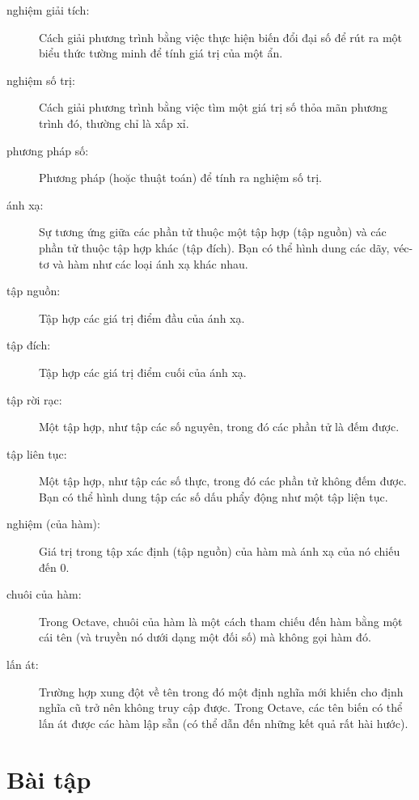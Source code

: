 \documentclass[12pt]{book}
\begin{document}
\begin{description}

\item[nghiệm giải tích:] Cách giải phương trình bằng việc thực hiện
biến đổi đại số để rút ra một biểu thức tường minh để tính giá trị
của một ẩn.

\item[nghiệm số trị:] Cách giải phương trình bằng việc tìm một 
giá trị số thỏa mãn phương trình đó, thường chỉ là xấp xỉ.

\item[phương pháp số:] Phương pháp (hoặc thuật toán) để tính ra
nghiệm số trị.

\item[ánh xạ:] Sự tương ứng giữa các phần tử thuộc một tập hợp
(tập nguồn) và các phần tử thuộc tập hợp khác (tập đích). Bạn có thể
hình dung các dãy, véc-tơ và hàm như các loại ánh xạ khác nhau.

\item[tập nguồn:] Tập hợp các giá trị điểm đầu của ánh xạ.

\item[tập đích:] Tập hợp các giá trị điểm cuối của ánh xạ.

\item[tập rời rạc:] Một tập hợp, như tập các số nguyên, trong đó
các phần tử là đếm được.

\item[tập liên tục:] Một tập hợp, như tập các số thực, trong đó
các phần tử không đếm được. Bạn có thể hình dung tập các số dấu
phẩy động như một tập liện tục.

\item[nghiệm (của hàm):] Giá trị trong tập xác định (tập nguồn) của
hàm mà ánh xạ của nó chiếu đến 0.

\item[chuôi của hàm:] Trong Octave, chuôi của hàm là một cách
tham chiếu đến hàm bằng một cái tên (và truyền nó dưới dạng một
đối số) mà không gọi hàm đó.

\item[lấn át:] Trường hợp xung đột về tên trong đó một định nghĩa mới
khiến cho định nghĩa cũ trở nên không truy cập được. Trong Octave,
các tên biến có thể lấn át được các hàm lập sẵn (có thể dẫn đến những
kết quả rất hài hước).

\end{description}

\section{Bài tập}
\end{document}
